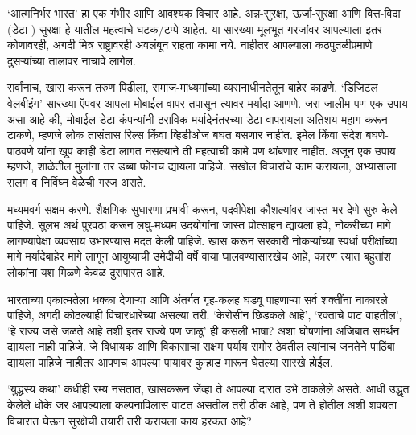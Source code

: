 `आत्मनिर्भर भारत' हा एक गंभीर आणि आवश्यक विचार आहे. अन्न-सुरक्षा, ऊर्जा-सुरक्षा आणि वित्त-विदा (डेटा ) सुरक्षा हे यातील महत्वाचे घटक/टप्पे आहेत. या सारख्या मूलभूत गरजांवर आपल्याला इतर कोणावरही, अगदी मित्र राष्ट्रावरही अवलंबून राहता कामा नये. नाहीतर आपल्याला कठपुतळीप्रमाणे दुसऱ्यांच्या तालावर नाचावे लागेल.

सर्वांनाच, खास करून तरुण पिढीला, समाज-माध्यमांच्या व्यसनाधीनतेतून बाहेर काढणे. `डिजिटल वेलबीइंग' सारख्या ऍपवर आपला मोबाईल वापर तपासून त्यावर मर्यादा आणणे. जरा जालीम पण एक उपाय असा आहे की, मोबाईल-डेटा कंपन्यांनी ठराविक मर्यादेनंतरच्या डेटा वापरायला अतिशय महाग करून टाकणे, म्हणजे लोक तासंतास रिल्स किंवा व्हिडीओज बघत बसणार नाहीत. इमेल किंवा संदेश बघणे-पाठवणे यांना खूप काही डेटा लागत नसल्याने ती महत्वाची कामे पण थांबणार नाहीत. अजून एक उपाय म्हणजे, शाळेतील मुलांना तर डब्बा फोनच द्यायला पाहिजे. सखोल विचारांचे काम करायला, अभ्यासाला सलग व निर्विघ्न वेळेची गरज असते.

मध्यमवर्ग सक्षम करणे. शैक्षणिक सुधारणा प्रभावी करून, पदवीपेक्षा कौशल्यांवर जास्त भर देणे सुरु केले पाहिजे. सुलभ अर्थ पुरवठा करून लघु-मध्यम उदयोगांना जास्त प्रोत्साहन द्यायला हवे, नोकरीच्या मागे लागण्यापेक्षा व्यवसाय उभारण्यास मदत केली पाहिजे. खास करून सरकारी नोकऱ्यांच्या स्पर्धा परीक्षांच्या मागे मर्यादेबाहेर मागे लागून आयुष्याची उमेदीची वर्षे वाया घालवण्यासारखेच आहे, कारण त्यात बहुतांश लोकांना यश मिळणे केवळ दुरापास्त आहे.

भारताच्या एकात्मतेला धक्का देणाऱ्या आणि अंतर्गत गृह-कलह घडवू पाहणाऱ्या सर्व शक्तींना नाकारले पाहिजे, अगदी कोठल्याही विचारधारेच्या असल्या तरी. `केरोसीन छिडकले आहे', `रक्ताचे पाट वाहतील', `हे राज्य जसे जळते आहे तशी इतर राज्ये पण जाळू' ही कसली भाषा? अशा घोषणांना अजिबात समर्थन द्यायला नाही पाहिजे. जे विधायक आणि विकासाचा सक्षम पर्याय समोर ठेवतील त्यांनाच जनतेने पाठिंबा द्यायला पाहिजे नाहीतर आपणच आपल्या पायावर कुऱ्हाड मारून घेतल्या सारखे होईल.

`युद्धस्य कथा' कधीही रम्य नसतात, खासकरून जेंव्हा ते आपल्या दारात उभे ठाकलेले असते. आधी उद्धृत केलेले धोके जर आपल्याला कल्पनाविलास वाटत असतील तरी ठीक आहे, पण ते होतील अशी शक्यता विचारात घेऊन सुरक्षेची तयारी तरी करायला काय हरकत आहे?